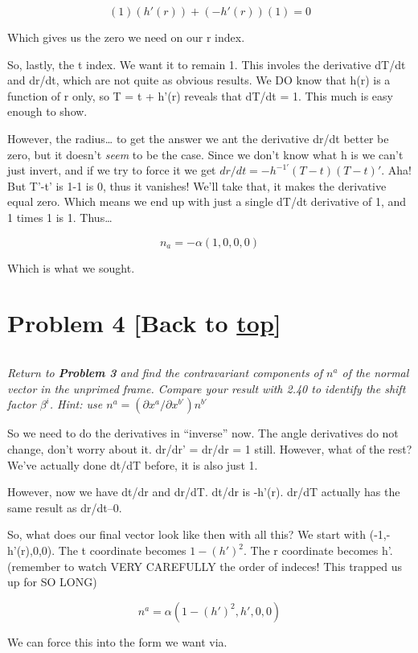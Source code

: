 \documentclass[landscape,letterpaper,10pt,english]{article}
\begin{document}
\[ (1)(h'(r)) + (-h'(r))(1) = 0 \]

Which gives us the zero we need on our r index.

So, lastly, the t index. We want it to remain 1. This involes the
derivative dT/dt and dr/dt, which are not quite as obvious results. We
DO know that h(r) is a function of r only, so T = t + h'(r) reveals that
dT/dt = 1. This much is easy enough to show.

However, the radius\ldots{} to get the answer we ant the derivative
dr/dt better be zero, but it doesn't \emph{seem} to be the case. Since
we don't know what h is we can't just invert, and if we try to force it
we get \(dr/dt = -h^{-1'}(T-t)(T-t)'\). Aha! But T'-t' is 1-1 is 0, thus
it vanishes! We'll take that, it makes the derivative equal zero. Which
means we end up with just a single dT/dt derivative of 1, and 1 times 1
is 1. Thus\ldots{}

\[ n_a = -\alpha(1,0,0,0) \]

Which is what we sought.

    \hypertarget{problem-4-back-to-top}{%
\section{\texorpdfstring{Problem 4 {[}Back to
\hyperref[toc]{top}{]}}{Problem 4 {[}Back to {]}}}\label{problem-4-back-to-top}}

\[\label{P4}\]

\emph{Return to \textbf{Problem 3} and find the contravariant components
of \(n^a\) of the normal vector in the unprimed frame. Compare your
result with 2.40 to identify the shift factor \(\beta^i\). Hint: use
\(n^a = (\partial x^a / \partial x^{b'}) n^{b'}\)}

    So we need to do the derivatives in ``inverse'' now. The angle
derivatives do not change, don't worry about it. dr/dr' = dr/dr = 1
still. However, what of the rest? We've actually done dt/dT before, it
is also just 1.

However, now we have dt/dr and dr/dT. dt/dr is -h'(r). dr/dT actually
has the same result as dr/dt--0.

So, what does our final vector look like then with all this? We start
with (-1,-h'(r),0,0). The t coordinate becomes \(1-(h')^2\). The r
coordinate becomes h'. (remember to watch VERY CAREFULLY the order of
indeces! This trapped us up for SO LONG)

\[ n^a = \alpha(1-(h')^2, h',0,0) \]

We can force this into the form we want via.
\end{document}
